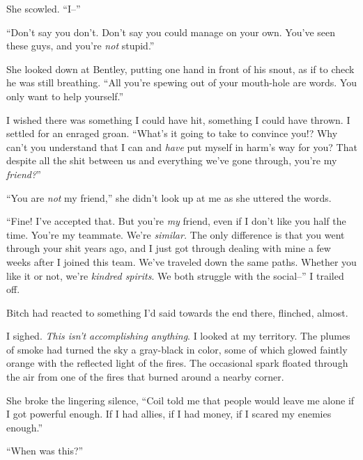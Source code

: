She scowled.  ``I--''



``Don't say you don't.  Don't say you could manage on your own.  You've seen these guys, and you're \emph{not} stupid.''



She looked down at Bentley, putting one hand in front of his snout, as if to check he was still breathing.  ``All you're spewing out of your mouth-hole are words.  You only want to help yourself.''



I wished there was something I could have hit, something I could have thrown.  I settled for an enraged groan.  ``What's it going to take to convince you!?  Why can't you understand that I can and \emph{have} put myself in harm's way for you?  That despite all the shit between us and everything we've gone through, you're my \emph{friend?}''



``You are \emph{not} my friend,'' she didn't look up at me as she uttered the words.



``Fine!  I've accepted that.  But you're \emph{my}\emph{ }friend, even if I don't like you half the time.  You're my teammate.  We're \emph{similar.  }The only difference is that you went through your shit years ago, and I just got through dealing with mine a few weeks after I joined this team.  We've traveled down the same paths.  Whether you like it or not, we're \emph{kindred spirits}.  We both struggle with the social--''  I trailed off.



Bitch had reacted to something I'd said towards the end there, flinched, almost.



I sighed.  \emph{This isn't accomplishing anything}.  I looked at my territory.  The plumes of smoke had turned the sky a gray-black in color, some of which glowed faintly orange with the reflected light of the fires.  The occasional spark floated through the air from one of the fires that burned around a nearby corner.



She broke the lingering silence, ``Coil told me that people would leave me alone if I got powerful enough.  If I had allies, if I had money, if I scared my enemies enough.''



``When was this?''



